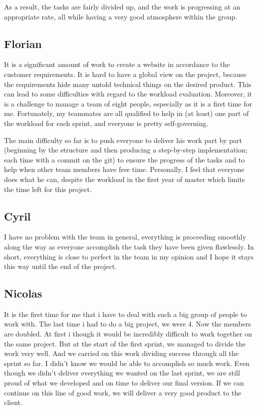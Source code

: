 As a result, the tasks are fairly divided up, and the work is progressing at an appropriate rate, all while having a very good atmosphere within the group.

\subsection{Florian}
It is a significant amount of work to create a website in accordance to the customer requirements. It is hard to have a global view on the project, because the requirements hide many untold technical things on the desired product. This can lead to some difficulties with regard to the workload evaluation. Moreover, it is a challenge to manage a team of eight people, especially as it is a first time for me. Fortunately, my
teammates are all qualified to help in (at least) one part of the workload for
each sprint, and everyone is pretty self-governing. \newline

The main difficulty so far is to push everyone to deliver his work part by
part (beginning by the structure and then producing a step-by-step
implementation; each time with a commit on the git) to ensure the progress
of the tasks and to help when other team members have free time.
Personally, I feel that everyone does what he can, despite the workload in
the first year of master which limits the time left for this project.\newline
\subsection{Cyril}

I have no problem with the team in general, everything is proceeding
smoothly along the way as everyone accomplish the task they have been given
flawlessly. In short, everything is close to perfect in the team in my
opinion and I hope it stays this way until the end of the project.
\subsection{Nicolas}
It is the first time for me that i have to deal with such a big group of people to work with. The last time i had to do a big project, we were 4. Now the members are doubled. At first i though it would be incredibly difficult to work together on the same project. But at the start of the first sprint, we managed to divide the work very well. And we carried on this work dividing success through all the sprint so far. I didn't know we would be able to accomplish so much work. Even though we didn't deliver everything we wanted on the last sprint, we are still proud of what we developed and on time to deliver our final version. If we can continue on this line of good work, we will deliver a very good product to the client.
